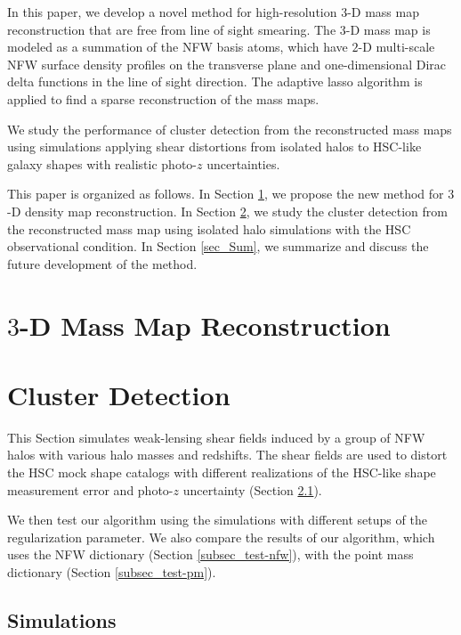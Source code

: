 \documentclass[twocolumn]{aastex63}
\begin{document}
In this paper, we develop a novel method for high-resolution $3$-D mass map
reconstruction that are free from line of sight smearing.  The $3$-D
mass map is modeled as a summation of the NFW \citep{halo-NFW1997ApJ} basis
atoms, which have $2$-D multi-scale NFW surface density profiles on the
transverse plane and one-dimensional Dirac delta functions in the line of sight
direction. The adaptive lasso algorithm \citep{AdaLASSO-Zou2006} is applied to
find a sparse reconstruction of the mass maps.

We study the performance of cluster detection from the reconstructed mass maps
using simulations applying shear distortions from isolated halos to HSC-like
galaxy shapes with realistic photo-$z$ uncertainties.


This paper is organized as follows.
In Section \ref{sec_Method}, we propose the new method for $3$-D density map
reconstruction.
In Section \ref{sec_Test}, we study the cluster detection from the
reconstructed mass map using isolated halo simulations with the HSC
observational condition.
In Section \ref{sec_Sum}, we summarize and discuss the future development of
the method.


\section{$3$-D Mass Map Reconstruction}
\label{sec_Method}


\section{Cluster Detection}
\label{sec_Test}

This Section simulates weak-lensing shear fields induced by a group of NFW
halos with various halo masses and redshifts. The shear fields are used to
distort the HSC mock shape catalogs with different realizations of the HSC-like
shape measurement error and photo-$z$ uncertainty (Section \ref{subsec_Sims}).

We then test our algorithm using the simulations with different setups of the
regularization parameter. We also compare the results of our algorithm, which
uses the NFW dictionary (Section \ref{subsec_test-nfw}), with the point mass
dictionary (Section \ref{subsec_test-pm}).

\subsection{Simulations}
\label{subsec_Sims}

\end{document}
